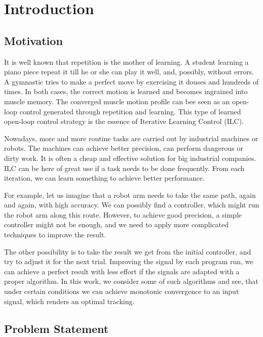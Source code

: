 \chapter{Introduction}

\section{Motivation} 

It is well known that repetition is the mother of learning. A student learning a piano piece repeat it till he or she can play it well, and, possibly, without errors. 
A gymnastic tries to make a perfect move by exercising it douses and hundreds of times. 
In both cases, the correct motion is learned and becomes ingrained into muscle memory. The converged muscle motion profile can bee seen as an open-loop control generated through repetition and learning. This type of learned open-loop control strategy is the essence of Iterative Learning Control (ILC). 

Nowadays, more and more routine tasks are carried out by industrial machines or robots. The machines can achieve better precision, can perform dangerous or dirty work. It is often a cheap and effective solution for big industrial companies. ILC can be here of great use if a  task needs to be done frequently. From each iteration, we can learn something to achieve better performance. 

For example, let us imagine that a robot arm needs to take the same path, again and again, with high accuracy. We can possibly find a controller, which might run the robot arm along this route. However, to achieve good precision, a simple controller might not be enough, and we need to apply more complicated techniques to improve the result. 

The other possibility is to take the result we get from the initial controller, and try to adjust it for the next trial. Improving the signal by each program run, we can achieve a perfect result with less effort if the signals are adapted with a proper algorithm. 
In this work, we consider some of such algorithms and see, that under certain conditions we can achieve monotonic convergence to an input signal, which renders an optimal tracking.




\section{Problem Statement}


